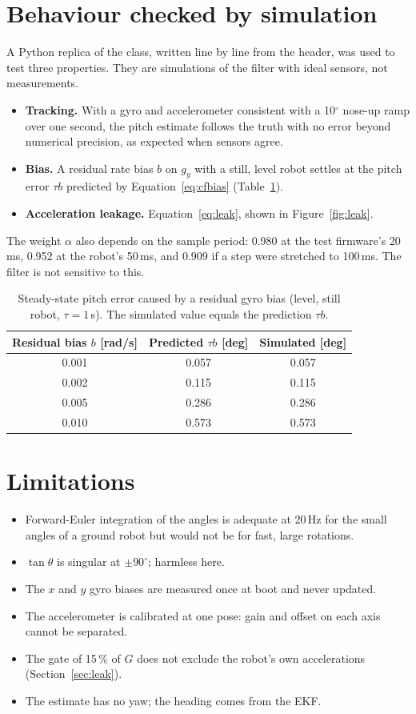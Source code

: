 \documentclass[11pt,a4paper]{report}
\begin{document}
\section{Behaviour checked by simulation}
A Python replica of the class, written line by line from the header, was used to test three properties. They are simulations of the filter with ideal sensors, not measurements.
\begin{itemize}[noitemsep]
  \item \textbf{Tracking.} With a gyro and accelerometer consistent with a 10$^\circ$ nose-up ramp over one second, the pitch estimate follows the truth with no error beyond numerical precision, as expected when sensors agree.
  \item \textbf{Bias.} A residual rate bias $b$ on $g_y$ with a still, level robot settles at the pitch error $\tau b$ predicted by Equation~\eqref{eq:cfbias} (Table~\ref{tab:attbias}).
  \item \textbf{Acceleration leakage.} Equation~\eqref{eq:leak}, shown in Figure~\ref{fig:leak}.
\end{itemize}
The weight $\alpha$ also depends on the sample period: 0.980 at the test firmware's 20\,ms, 0.952 at the robot's 50\,ms, and 0.909 if a step were stretched to 100\,ms. The filter is not sensitive to this.

\begin{table}[H]
\centering
\caption{Steady-state pitch error caused by a residual gyro bias (level, still robot, $\tau=1$\,s). The simulated value equals the prediction $\tau b$.}\label{tab:attbias}
\small
\begin{tabular}{@{}ccc@{}}
\toprule
Residual bias $b$ [rad/s] & Predicted $\tau b$ [deg] & Simulated [deg]\\
\midrule
0.001 & 0.057 & 0.057 \\
0.002 & 0.115 & 0.115 \\
0.005 & 0.286 & 0.286 \\
0.010 & 0.573 & 0.573 \\
\bottomrule
\end{tabular}
\end{table}

\section{Limitations}
\begin{itemize}[noitemsep]
  \item Forward-Euler integration of the angles is adequate at 20\,Hz for the small angles of a ground robot but would not be for fast, large rotations.
  \item $\tan\theta$ is singular at $\pm90^\circ$; harmless here.
  \item The $x$ and $y$ gyro biases are measured once at boot and never updated.
  \item The accelerometer is calibrated at one pose: gain and offset on each axis cannot be separated.
  \item The gate of 15\,\% of $G$ does not exclude the robot's own accelerations (Section~\ref{sec:leak}).
  \item The estimate has no yaw; the heading comes from the EKF.
\end{itemize}
\end{document}
